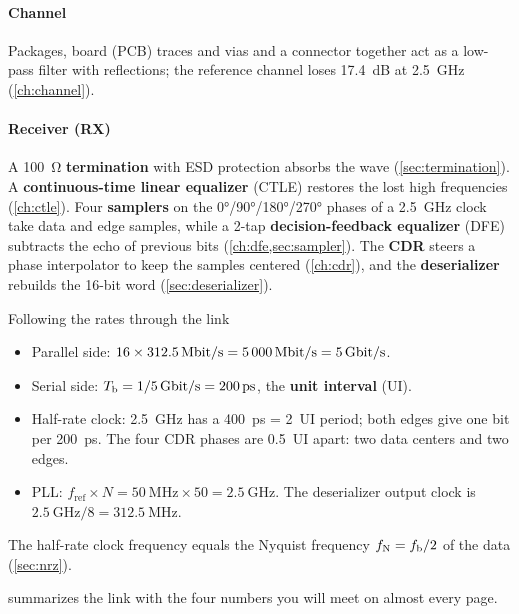 \paragraph{Channel} Packages, board (PCB) traces and vias and a connector together act as a low-pass filter with reflections; the \OS{} reference channel loses \qty{17.4}{\deci\bel} at \qty{2.5}{\giga\hertz} (\cref{ch:channel}).

\paragraph{Receiver (RX)} A \qty{100}{\ohm} \textbf{termination} with ESD protection absorbs the wave (\cref{sec:termination}). A \textbf{continuous-time linear equalizer} (CTLE) restores the lost high frequencies (\cref{ch:ctle}). Four \textbf{samplers} on the \ang{0}/\ang{90}/\ang{180}/\ang{270} phases of a \qty{2.5}{\giga\hertz} clock take data and edge samples, while a 2-tap \textbf{decision-feedback equalizer} (DFE) subtracts the echo of previous bits (\cref{ch:dfe,sec:sampler}). The \textbf{CDR} steers a phase interpolator to keep the samples centered (\cref{ch:cdr}), and the \textbf{deserializer} rebuilds the 16-bit word (\cref{sec:deserializer}).

\begin{example}{Following the rates through the link}\label{we:ch1-rates}
\begin{itemize}
  \item Parallel side: $16 \times \qty{312.5}{\mega\bit\per\second} = \qty{5000}{\mega\bit\per\second} = \qty{5}{\giga\bit\per\second}$.
  \item Serial side: $\Tb = 1/\qty{5}{\giga\bit\per\second} = \qty{200}{\pico\second}$, the \textbf{unit interval} (UI).
  \item Half-rate clock: \qty{2.5}{\giga\hertz} has a \qty{400}{\pico\second} = 2~UI period; both edges give one bit per \qty{200}{\pico\second}. The four CDR phases are 0.5~UI apart: two data centers and two edges.
  \item PLL: $f_\mathrm{ref} \times N = \qty{50}{\mega\hertz}\times 50 = \qty{2.5}{\giga\hertz}$. The deserializer output clock is $\qty{2.5}{\giga\hertz}/8 = \qty{312.5}{\mega\hertz}$.
\end{itemize}
The half-rate clock frequency equals the Nyquist frequency $f_\mathrm{N} = f_\mathrm{b}/2$ of the data (\cref{sec:nrz}).
\end{example}

 summarizes the link with the four numbers you will meet on almost every page.

